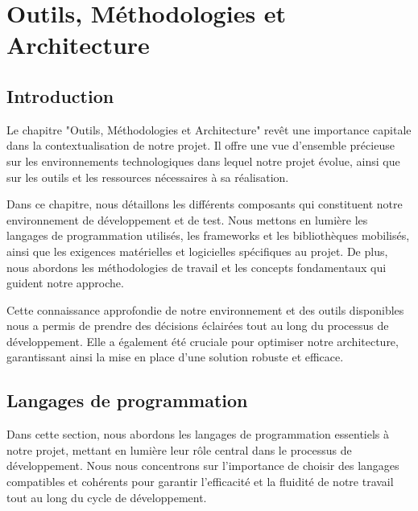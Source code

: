 \chapter{Outils, Méthodologies et Architecture}
\label{chap:Chapter 3 title}
\section*{Introduction}

\hspace{\parindent}Le chapitre "Outils, Méthodologies et Architecture" revêt une importance capitale dans la contextualisation de notre projet. Il offre une vue d'ensemble précieuse sur les environnements technologiques dans lequel notre projet évolue, ainsi que sur les outils et les ressources nécessaires à sa réalisation.

Dans ce chapitre, nous détaillons les différents composants qui constituent notre environnement de développement et de test. Nous mettons en lumière les langages de programmation utilisés, les frameworks et les bibliothèques mobilisés, ainsi que les exigences matérielles et logicielles spécifiques au projet. De plus, nous abordons les méthodologies de travail et les concepts fondamentaux qui guident notre approche.

Cette connaissance approfondie de notre environnement et des outils disponibles nous a permis de prendre des décisions éclairées tout au long du processus de développement. Elle a également été cruciale pour optimiser notre architecture, garantissant ainsi la mise en place d'une solution robuste et efficace.

\newpage


\section{Langages de programmation}

\hspace{\parindent}Dans cette section, nous abordons les langages de programmation essentiels à notre projet, mettant en lumière leur rôle central dans le processus de développement. Nous nous concentrons sur l'importance de choisir des langages compatibles et cohérents pour garantir l'efficacité et la fluidité de notre travail tout au long du cycle de développement.


